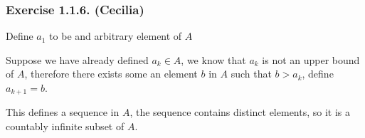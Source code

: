 \subsubsection*{Exercise 1.1.6. (Cecilia)}

Define $ a_1 $ to be and arbitrary element of $ A $

Suppose we have already defined $ a_k \in A $, we know that $ a_k $ is not an upper bound of $ A $, therefore there exists some an element $ b $ in $ A $ such that $ b > a_k $, define $ a_{k+1} = b $.

This defines a sequence in $ A $, the sequence contains distinct elements, so it is a countably infinite subset of $ A $.
